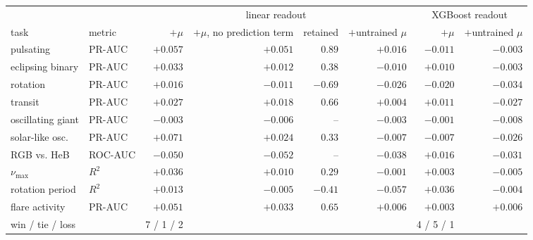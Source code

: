 \begin{tabular}{llrrrrrr}
\toprule
 & & \multicolumn{4}{c}{linear readout} & \multicolumn{2}{c}{XGBoost readout} \\
\cmidrule(lr){3-6}\cmidrule(lr){7-8}
task & metric & $+\mu$ & $+\mu$, no prediction term & retained & $+$untrained $\mu$ & $+\mu$ & $+$untrained $\mu$ \\
\midrule
pulsating & PR-AUC & $\boldsymbol{+}\mathbf{0.057}$ & $\boldsymbol{+}\mathbf{0.051}$ & $0.89$ & ${+}0.016$ & ${-}0.011$ & ${-}0.003$ \\
eclipsing binary & PR-AUC & $\boldsymbol{+}\mathbf{0.033}$ & $\boldsymbol{+}\mathbf{0.012}$ & $0.38$ & ${-}0.010$ & $\boldsymbol{+}\mathbf{0.010}$ & ${-}0.003$ \\
rotation & PR-AUC & ${+}0.016$ & $\boldsymbol{-}\mathbf{0.011}$ & $-0.69$ & ${-}0.026$ & $\boldsymbol{-}\mathbf{0.020}$ & ${-}0.034$ \\
transit & PR-AUC & $\boldsymbol{+}\mathbf{0.027}$ & $\boldsymbol{+}\mathbf{0.018}$ & $0.66$ & ${+}0.004$ & ${+}0.011$ & ${-}0.027$ \\
oscillating giant & PR-AUC & $\boldsymbol{-}\mathbf{0.003}$ & $\boldsymbol{-}\mathbf{0.006}$ & -- & ${-}0.003$ & ${-}0.001$ & ${-}0.008$ \\
solar-like osc. & PR-AUC & $\boldsymbol{+}\mathbf{0.071}$ & $\boldsymbol{+}\mathbf{0.024}$ & $0.33$ & ${-}0.007$ & ${-}0.007$ & ${-}0.026$ \\
RGB vs. HeB & ROC-AUC & $\boldsymbol{-}\mathbf{0.050}$ & $\boldsymbol{-}\mathbf{0.052}$ & -- & ${-}0.038$ & $\boldsymbol{+}\mathbf{0.016}$ & ${-}0.031$ \\
$\nu_{\max}$ & $R^2$ & $\boldsymbol{+}\mathbf{0.036}$ & $\boldsymbol{+}\mathbf{0.010}$ & $0.29$ & ${-}0.001$ & $\boldsymbol{+}\mathbf{0.003}$ & ${-}0.005$ \\
rotation period & $R^2$ & $\boldsymbol{+}\mathbf{0.013}$ & ${-}0.005$ & $-0.41$ & ${-}0.057$ & $\boldsymbol{+}\mathbf{0.036}$ & ${-}0.004$ \\
flare activity & PR-AUC & $\boldsymbol{+}\mathbf{0.051}$ & $\boldsymbol{+}\mathbf{0.033}$ & $0.65$ & ${+}0.006$ & ${+}0.003$ & ${+}0.006$ \\
\midrule
win / tie / loss & & 7 / 1 / 2 & & & & 4 / 5 / 1 & \\
\bottomrule
\end{tabular}
